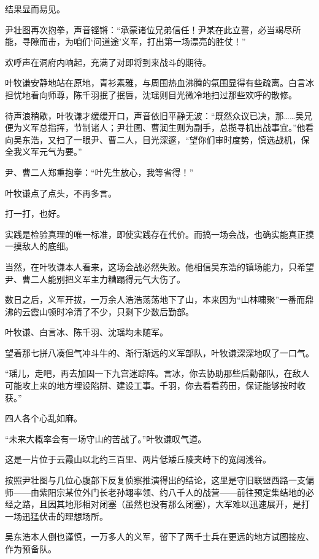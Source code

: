 结果显而易见。

尹壮图再次抱拳，声音铿锵：“承蒙诸位兄弟信任！尹某在此立誓，必当竭尽所能，寻隙而击，为咱们‘问道途’义军，打出第一场漂亮的胜仗！”

欢呼声在洞府内响起，充满了对即将到来战斗的期待。

叶牧谦安静地站在原地，青衫素雅，与周围热血沸腾的氛围显得有些疏离。白言冰担忧地看向师尊，陈千羽抿了抿唇，沈瑶则目光微冷地扫过那些欢呼的散修。

待声浪稍歇，叶牧谦才缓缓开口，声音依旧平静无波：“既然众议已决，那……吴兄便为义军总指挥，节制诸人；尹壮图、曹润生则为副手，总揽寻机出战事宜。”他看向吴东浩，又扫了一眼尹、曹二人，目光深邃，“望你们审时度势，慎选战机，保全我义军元气为要。”

尹、曹二人郑重抱拳：“叶先生放心，我等省得！”

叶牧谦点了点头，不再多言。

打一打，也好。

实践是检验真理的唯一标准，即使实践存在代价。而搞一场会战，也确实能真正摸一摸敌人的底细。

当然，在叶牧谦本人看来，这场会战必然失败。他相信吴东浩的镇场能力，只希望尹、曹二人能别把义军主力糟蹋得元气大伤了。

\vspace{2em}

数日之后，义军开拔，一万余人浩浩荡荡地下了山，本来因为“山林啸聚”一番而鼎沸的云霞山顿时冷清了不少，只剩下少数后勤部。

叶牧谦、白言冰、陈千羽、沈瑶均未随军。

望着那七拼八凑但气冲斗牛的、渐行渐远的义军部队，叶牧谦深深地叹了一口气。

“瑶儿，走吧，再去加固一下九宫迷踪阵。言冰，你去协助那些后勤部队，在敌人可能攻上来的地方埋设陷阱、建设工事。千羽，你去看看药田，保证能够按时收获。”

四人各个心乱如麻。

“未来大概率会有一场守山的苦战了。”叶牧谦叹气道。

\vspace{2em}

这是一片位于云霞山以北约三百里、两片低矮丘陵夹峙下的宽阔浅谷。

按照尹壮图与几位心腹部下反复侦察推演得出的结论，这里是守旧联盟西路一支偏师——由紫阳宗某位外门长老孙翊率领、约八千人的战营——前往预定集结地的必经之路，且因其地形相对闭塞（虽然也没有那么闭塞），大军难以迅速展开，是打一场迅猛伏击的理想场所。

吴东浩本人倒也谨慎，一万多人的义军，留下了两千士兵在更远的地方试图接应、作为预备队。

